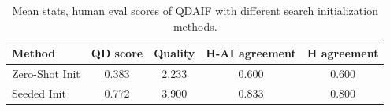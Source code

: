 \begin{table}[!t]
\caption{Mean stats, human eval scores of QDAIF with different search initialization methods. }
\label{table:mean_human_eval_init_method}
\centering
\small
\begin{tabular}{lcccc}
\toprule
\textbf{Method} &
\textbf{QD score} & \textbf{Quality} & \textbf{H-AI agreement} & \textbf{H agreement }  \\
\midrule
Zero-Shot Init & 0.383 & 2.233 & 0.600 & 0.600  \\
Seeded Init & 0.772 & 3.900 & 0.833 & 0.800  \\
\bottomrule
\end{tabular}
\end{table}

